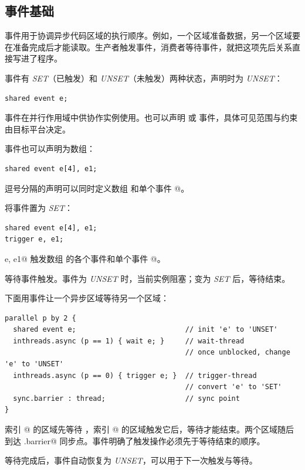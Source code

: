 \subsection*{事件基础}

事件用于协调异步代码区域的执行顺序。例如，一个区域准备数据，另一个区域要在准备完成后才能读取。生产者触发事件，消费者等待事件，就把这项先后关系直接写进了程序。

事件有 \emph{SET}（已触发）和 \emph{UNSET}（未触发）两种状态，声明时为 \emph{UNSET}：

\begin{lstlisting}[language=croqtile,caption={声明一个共享事件}]
shared event e;
\end{lstlisting}

\co@shared@ 事件在并行作用域中供协作实例使用。也可以声明 \co@global@ 或 \co@local@ 事件，具体可见范围与约束由目标平台决定。

事件也可以声明为数组：

\begin{lstlisting}[language=croqtile,caption={声明事件数组}]
shared event e[4], e1;
\end{lstlisting}

逗号分隔的声明可以同时定义数组 \co@e@ 和单个事件 @。

\co@trigger@ 将事件置为 \emph{SET}：

\begin{lstlisting}[language=croqtile,caption={触发事件数组}]
shared event e[4], e1;
trigger e, e1;
\end{lstlisting}

\co@trigger e, e1@ 触发数组 \co@e@ 的各个事件和单个事件 @。

\co@wait@ 等待事件触发。事件为 \emph{UNSET} 时，当前实例阻塞；变为 \emph{SET} 后，等待结束。

下面用事件让一个异步区域等待另一个区域：

\begin{lstlisting}[language=croqtile,caption={等待事件}]
parallel p by 2 {
  shared event e;                          // init 'e' to 'UNSET'
  inthreads.async (p == 1) { wait e; }     // wait-thread
                                           // once unblocked, change 'e' to 'UNSET'
  inthreads.async (p == 0) { trigger e; }  // trigger-thread
                                           // convert 'e' to 'SET'
  sync.barrier : thread;                   // sync point
}
\end{lstlisting}

索引 @ 的区域先等待 \co@e@，索引 @ 的区域触发它后，等待才能结束。两个区域随后到达 \co@sync.barrier@ 同步点。事件明确了触发操作必须先于等待结束的顺序。

等待完成后，事件自动恢复为 \emph{UNSET}，可以用于下一次触发与等待。
